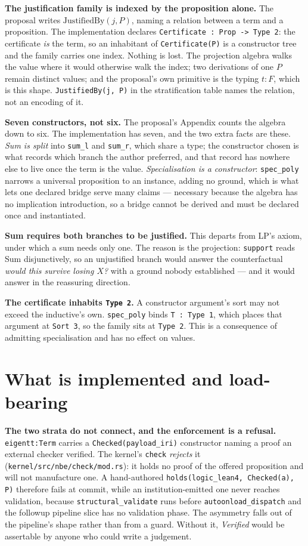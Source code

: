 \documentclass[manuscript,nonacm=true]{acmart}
\newcommand{\code}[1]{\texttt{\small #1}}
\newcommand{\cl}[1]{\textbf{#1}}
\begin{document}
\cl{The justification family is indexed by the proposition alone.} The proposal writes $\mathrm{JustifiedBy}(j, P)$, naming a relation between a term and a proposition. The implementation declares \code{Certificate : Prop -> Type 2}: the certificate \emph{is} the term, so an inhabitant of \code{Certificate(P)} is a constructor tree and the family carries one index. Nothing is lost. The projection algebra walks the value where it would otherwise walk the index; two derivations of one $P$ remain distinct values; and the proposal's own primitive is the typing $t : F$, which is this shape. \code{JustifiedBy(j, P)} in the stratification table names the relation, not an encoding of it.

\cl{Seven constructors, not six.} The proposal's Appendix counts the algebra down to six. The implementation has seven, and the two extra facts are these. \emph{Sum is split} into \code{sum\_l} and \code{sum\_r}, which share a type; the constructor chosen is what records which branch the author preferred, and that record has nowhere else to live once the term is the value. \emph{Specialisation is a constructor}: \code{spec\_poly} narrows a universal proposition to an instance, adding no ground, which is what lets one declared bridge serve many claims --- necessary because the algebra has no implication introduction, so a bridge cannot be derived and must be declared once and instantiated.

\cl{Sum requires both branches to be justified.} This departs from LP's axiom, under which a sum needs only one. The reason is the projection: \code{support} reads Sum disjunctively, so an unjustified branch would answer the counterfactual \emph{would this survive losing $X$?} with a ground nobody established --- and it would answer in the reassuring direction.

\cl{The certificate inhabits \code{Type 2}.} A constructor argument's sort may not exceed the inductive's own. \code{spec\_poly} binds \code{T : Type 1}, which places that argument at \code{Sort 3}, so the family sits at \code{Type 2}. This is a consequence of admitting specialisation and has no effect on values.

\section{What is implemented and load-bearing}

\cl{The two strata do not connect, and the enforcement is a refusal.} \code{eigentt:Term} carries a \code{Checked(payload\_iri)} constructor naming a proof an external checker verified. The kernel's \code{check} \emph{rejects} it (\code{kernel/src/nbe/check/mod.rs}): it holds no proof of the offered proposition and will not manufacture one. A hand-authored \code{holds(logic\_lean4, Checked(a), P)} therefore fails at commit, while an institution-emitted one never reaches validation, because \code{structural\_validate} runs before \code{autoonload\_dispatch} and the followup pipeline slice has no validation phase. The asymmetry falls out of the pipeline's shape rather than from a guard. Without it, \emph{Verified} would be assertable by anyone who could write a judgement.
\end{document}

